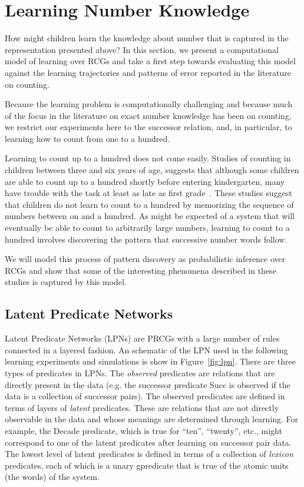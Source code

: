 \documentclass[10pt,letterpaper]{article}
\begin{document}
\section{Learning Number Knowledge}

How might children learn the knowledge about number that is captured
in the representation presented above? In this section, we present a
computational model of learning over RCGs and take a first step
towards evaluating this model against the learning trajectories and
patterns of error reported in the literature on counting. 

Because the learning problem is computationally challenging and
because much of the focus in the literature on exact number knowledge
has been on counting, we restrict our experiments here to the
successor relation, and, in particular, to learning how to count from
one to a hundred.

Learning to count up to a hundred does not come easily. Studies of
counting in children between three and six years of age, suggests that
although some children are able to count up to a hundred shortly
before entering kindergarten, many have trouble with the task at least
as late as first
grade~\cite{FusRicBriar1982,miller1987counting}. These studies suggest
that children do not learn to count to a hundred by memorizing the
sequence of numbers between on and a hundred. As might be expected of
a system that will eventually be able to count to arbitrarily large
numbers, learning to count to a hundred involves discovering the
pattern that successive number words follow. 

We will model this process of pattern discovery as probabilistic
inference over RCGs and show that some of the interesting phenomena
described in these studies is captured by this model. 

\subsection{Latent Predicate Networks}
Latent Predicate Networks (LPNs) are PRCGs with a large number of
rules connected in a layered fashion. An schematic of the LPN used in
the following learning experiments and simulations is show in
Figure~\ref{fig:lpn}. There are three types of predicates in LPNs. The
\emph{observed} predicates are relations that are directly present in
the data (e.g. the successor predicate Succ is observed if the data is
a collection of successor pairs). The observed predicates are defined
in terms of layers of \emph{latent} predicates. These are relations
that are not directly observable in the data and whose meanings are
determined through learning. For example, the Decade predicate, which
is true for ``ten'', ``twenty'', etc., might correspond to one of the
latent predicates after learning on successor pair data. The lowest
level of latent predicates is defined in terms of a collection of
\emph{lexicon} predicates, each of which is a unary gpredicate that is
true of the atomic units (the words) of the system.
\end{document}

